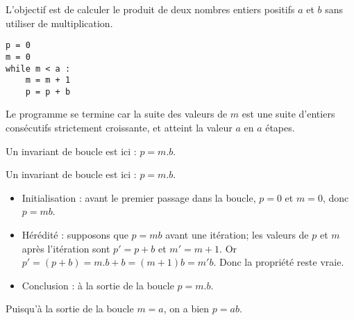 
L’objectif est de calculer le produit de deux nombres entiers positifs $a$ et $b$ sans utiliser de multiplication.
\begin{lstlisting}
p = 0
m = 0
while m < a :
    m = m + 1
    p = p + b
\end{lstlisting}

\ifprof
\begin{corrige}
Le programme se termine car la suite des valeurs de $m$ est une suite
d’entiers consécutifs strictement croissante, et atteint la valeur $a$ en $a$ étapes.
\end{corrige}
\else
\fi

\ifprof
\begin{corrige}
Un invariant de boucle est ici : $p = m.b$.
\end{corrige}
\else
\fi


\ifprof
\begin{corrige}

Un invariant de boucle est ici : $p = m.b$.

\begin{itemize}
\item Initialisation : avant le premier passage dans la boucle, $p = 0$ et $m = 0$, donc $p = mb$.
\item Hérédité : supposons que $p = mb$ avant une itération; les valeurs de $p$ et $m$ après l’itération sont
$p'= p + b$ et $m' = m + 1$. Or $p'= (p + b) = m.b + b = (m + 1)b = m'b$. Donc la propriété
reste vraie.
\item Conclusion : à la sortie de la boucle $p = m.b$.
\end{itemize}
Puisqu’à la sortie de la boucle $m = a$, on a bien $p = ab$.
\end{corrige}
\else
\fi